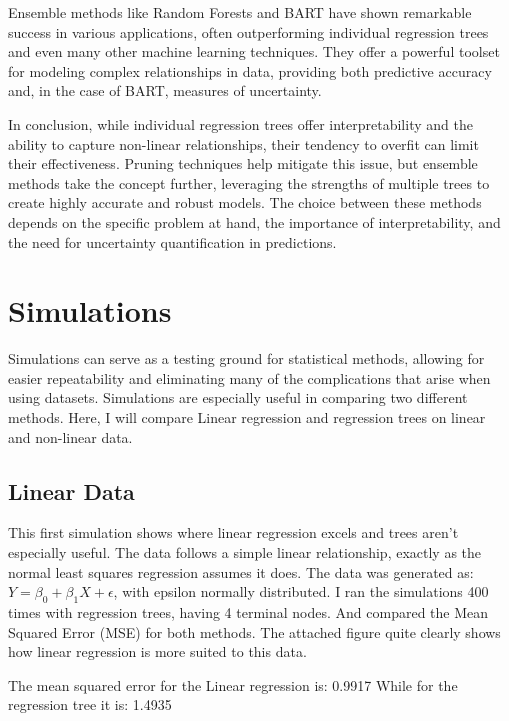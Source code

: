 \documentclass[12pt]{article}
\begin{document}
Ensemble methods like Random Forests and BART have shown remarkable success in various applications, often outperforming individual regression trees and even many other machine learning techniques. They offer a powerful toolset for modeling complex relationships in data, providing both predictive accuracy and, in the case of BART, measures of uncertainty.

In conclusion, while individual regression trees offer interpretability and the ability to capture non-linear relationships, their tendency to overfit can limit their effectiveness. Pruning techniques help mitigate this issue, but ensemble methods take the concept further, leveraging the strengths of multiple trees to create highly accurate and robust models. The choice between these methods depends on the specific problem at hand, the importance of interpretability, and the need for uncertainty quantification in predictions.





\section{Simulations}

Simulations can serve as a testing ground for statistical methods, allowing for easier repeatability and eliminating many of the complications that arise when using datasets. Simulations are especially useful in comparing two different methods. Here, I will compare Linear regression and regression trees on linear and non-linear data.

\subsection{Linear Data}


This first simulation shows where linear regression excels and trees aren't especially useful. The data follows a simple linear relationship, exactly as the normal least squares regression assumes it does. The data was generated as: $Y = \beta_0 + \beta_1X + \epsilon$, with epsilon normally distributed. I ran the simulations 400 times with regression trees, having 4 terminal nodes. And compared the Mean Squared Error (MSE) for both methods. The attached figure quite clearly shows how linear regression is more suited to this data.



The mean squared error for the Linear regression is: 0.9917
While for the regression tree it is: 1.4935
\end{document}
